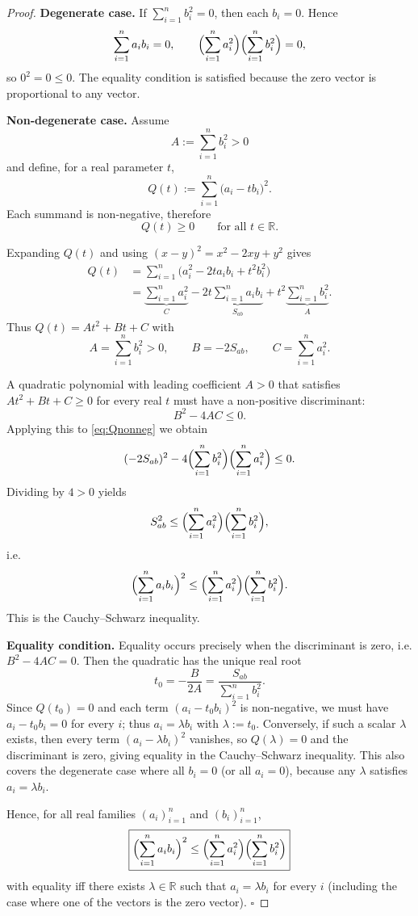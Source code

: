 \begin{proof}
\textbf{Degenerate case.} If \(\displaystyle\sum_{i=1}^{n}b_i^{2}=0\), then each \(b_i=0\). Hence
\[
\sum_{i=1}^{n}a_i b_i =0,
\qquad 
\Bigl(\sum_{i=1}^{n}a_i^{2}\Bigr)\Bigl(\sum_{i=1}^{n}b_i^{2}\Bigr)=0,
\]
so \(0^{2}=0\le 0\). The equality condition is satisfied because the zero vector is proportional to any vector.

\medskip

\textbf{Non‑degenerate case.} Assume
\[
A:=\sum_{i=1}^{n}b_i^{2}>0
\]
and define, for a real parameter \(t\),
\[
Q(t):=\sum_{i=1}^{n}\bigl(a_i-t b_i\bigr)^{2}.
\]
Each summand is non‑negative, therefore
\begin{equation}
Q(t)\ge 0\qquad\text{for all }t\in\mathbb{R}. \label{eq:Qnonneg}
\end{equation}

Expanding \(Q(t)\) and using \((x-y)^{2}=x^{2}-2xy+y^{2}\) gives
\begin{align*}
Q(t)
&=\sum_{i=1}^{n}\bigl(a_i^{2}-2t a_i b_i+t^{2}b_i^{2}\bigr) \\
&= \underbrace{\sum_{i=1}^{n}a_i^{2}}_{C}
   -2t\underbrace{\sum_{i=1}^{n}a_i b_i}_{S_{ab}}
   +t^{2}\underbrace{\sum_{i=1}^{n}b_i^{2}}_{A}.
\end{align*}
Thus \(Q(t)=A t^{2}+B t +C\) with
\[
A=\sum_{i=1}^{n}b_i^{2}>0,\qquad
B=-2S_{ab},\qquad
C=\sum_{i=1}^{n}a_i^{2}.
\]

A quadratic polynomial with leading coefficient \(A>0\) that satisfies
\(At^{2}+Bt+C\ge0\) for every real \(t\) must have a non‑positive
discriminant:
\[
B^{2}-4AC\le 0.
\]
Applying this to \eqref{eq:Qnonneg} we obtain
\[
(-2S_{ab})^{2}-4\Bigl(\sum_{i=1}^{n}b_i^{2}\Bigr)\Bigl(\sum_{i=1}^{n}a_i^{2}\Bigr)\le0.
\]
Dividing by \(4>0\) yields
\[
S_{ab}^{2}\le\Bigl(\sum_{i=1}^{n}a_i^{2}\Bigr)\Bigl(\sum_{i=1}^{n}b_i^{2}\Bigr),
\]
i.e.
\[
\Bigl(\sum_{i=1}^{n}a_i b_i\Bigr)^{2}
\le
\Bigl(\sum_{i=1}^{n}a_i^{2}\Bigr)
\Bigl(\sum_{i=1}^{n}b_i^{2}\Bigr).
\]
This is the Cauchy–Schwarz inequality.

\medskip

\textbf{Equality condition.} Equality occurs precisely when the
discriminant is zero, i.e. \(B^{2}-4AC=0\). Then the quadratic has the
unique real root
\[
t_{0}= -\frac{B}{2A}= \frac{S_{ab}}{\sum_{i=1}^{n}b_i^{2}}.
\]
Since \(Q(t_{0})=0\) and each term \((a_i-t_{0}b_i)^{2}\) is
non‑negative, we must have \(a_i-t_{0}b_i=0\) for every \(i\); thus
\(a_i=\lambda b_i\) with \(\lambda:=t_{0}\). Conversely, if such a scalar
\(\lambda\) exists, then every term \((a_i-\lambda b_i)^{2}\) vanishes,
so \(Q(\lambda)=0\) and the discriminant is zero, giving equality in the
Cauchy–Schwarz inequality. This also covers the degenerate case where
all \(b_i=0\) (or all \(a_i=0\)), because any \(\lambda\) satisfies
\(a_i=\lambda b_i\).

Hence, for all real families \((a_i)_{i=1}^{n}\) and \((b_i)_{i=1}^{n}\),
\[
\boxed{\displaystyle
\Bigl(\sum_{i=1}^{n}a_i b_i\Bigr)^{2}
\le
\Bigl(\sum_{i=1}^{n}a_i^{2}\Bigr)
\Bigl(\sum_{i=1}^{n}b_i^{2}\Bigr)}
\]
with equality iff there exists \(\lambda\in\mathbb{R}\) such that
\(a_i=\lambda b_i\) for every \(i\) (including the case where one of
the vectors is the zero vector). \(\square\)
\end{proof}